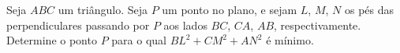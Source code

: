 Seja $ABC$ um triângulo. Seja $P$ um ponto no plano, e sejam $L$, $M$, $N$ os pés das perpendiculares passando por $P$ aos lados $BC$, $CA$, $AB$, respectivamente.
Determine o ponto $P$ para o qual $BL^2 + CM^2 + AN^2$ é mínimo.
